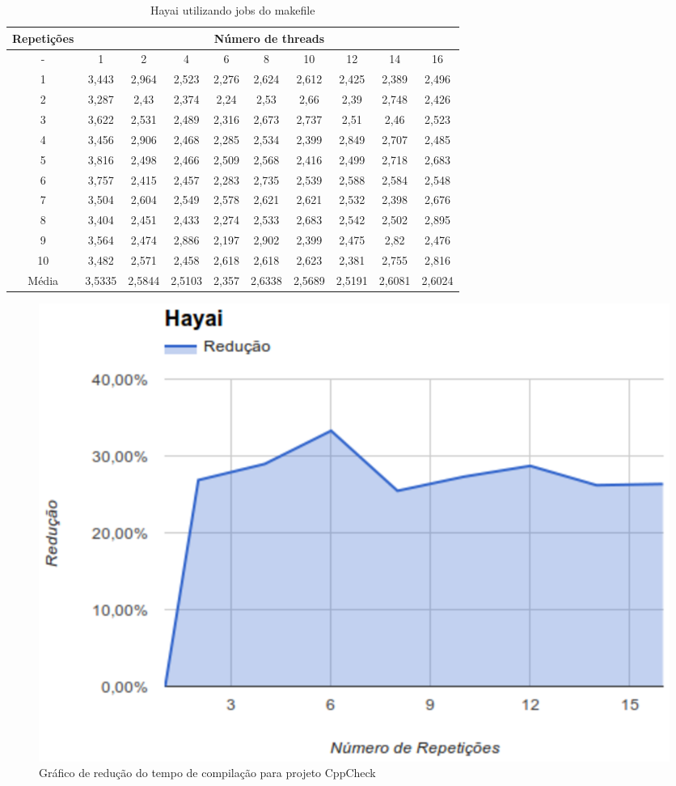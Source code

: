 \begin{table}[h]
\centering
\begin{tiny}
\begin{tabular}{cccccccccc}
\toprule
\textbf{Repetições} & \multicolumn{9}{c}{\textbf{Número de threads}} \\ \midrule
- & 1 & 2 & 4 & 6 & 8 & 10 & 12 & 14 & 16 \\ 
1 & 3,443 & 2,964  & 2,523 &2,276 &2,624    & 2,612   &2,425    &2,389  &2,496  \\ 
2 & 3,287 & 2,43   & 2,374 &2,24  &2,53     & 2,66    &2,39     &2,748  &2,426   \\ 
3 & 3,622 & 2,531  & 2,489 &2,316 &2,673    & 2,737   &2,51     &2,46   &2,523 \\ 
4 & 3,456 & 2,906  & 2,468 &2,285 &2,534    & 2,399   &2,849    &2,707  &2,485 \\ 
5 & 3,816 & 2,498  & 2,466 &2,509 &2,568    & 2,416   &2,499    &2,718  &2,683 \\ 
6 & 3,757 & 2,415  & 2,457 &2,283 &2,735    & 2,539   &2,588    &2,584  &2,548 \\ 
7 & 3,504 & 2,604  & 2,549 &2,578 &2,621    & 2,621   &2,532    &2,398  &2,676 \\ 
8 & 3,404 & 2,451  & 2,433 &2,274 &2,533    & 2,683   &2,542    &2,502  &2,895 \\ 
9 & 3,564 & 2,474  & 2,886 &2,197 &2,902    & 2,399   &2,475    &2,82   &2,476 \\ 
10 & 3,482 & 2,571  & 2,458 &2,618 &2,618    & 2,623   &2,381    &2,755  &2,816 \\ \midrule
Média & 3,5335 &  2,5844 & 2,5103 & 2,357 & 2,6338 & 2,5689 & 2,5191 &2,6081 &2,6024 \\ \bottomrule
\end{tabular}
\end{tiny}
\caption{Hayai utilizando jobs do makefile}
\label{tab:hayai}
\end{table}

\begin{figure}[h]
    \centering
        \includegraphics[keepaspectratio=true,scale=1]{figuras/hayai.eps}
    \caption{Gráfico de redução do tempo de compilação para projeto CppCheck}
    \label{hayai}
\end{figure}

